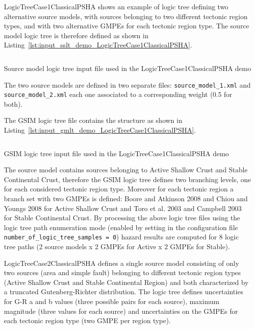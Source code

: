 LogicTreeCase1ClassicalPSHA shows an example of logic tree defining two
alternative source models, with sources belonging to two different tectonic
region types, and with two alternative GMPEs for each tectonic  region type.
The source model logic tree is therefore defined as shown in
Listing~\ref{lst:input_sslt_demo_LogicTreeCase1ClassicalPSHA}.

\begin{listing}[htbp]
  \inputminted[firstline=1,firstnumber=1,fontsize=\footnotesize,frame=single,linenos,bgcolor=lightgray]{xml}{oqum/hazard/verbatim/input_sslt_demo_LogicTreeCase1ClassicalPSHA.xml}
  \caption{Source model logic tree input file used in the LogicTreeCase1ClassicalPSHA demo}
  \label{lst:input_sslt_demo_LogicTreeCase1ClassicalPSHA}
\end{listing}

The two source models are defined in two separate files:
\texttt{source\_\-model\_\-1.xml} and \texttt{source\_\-model\_\-2.xml} each
one associated to a corresponding weight (0.5 for both).

The GSIM logic tree file contains the structure as shown in
Listing~\ref{lst:input_gmlt_demo_LogicTreeCase1ClassicalPSHA}.

\begin{listing}[htbp]
  \inputminted[firstline=1,firstnumber=1,fontsize=\footnotesize,frame=single,linenos,bgcolor=lightgray]{xml}{oqum/hazard/verbatim/input_gmlt_demo_LogicTreeCase1ClassicalPSHA.xml}
  \caption{GSIM logic tree input file used in the LogicTreeCase1ClassicalPSHA demo}
  \label{lst:input_gmlt_demo_LogicTreeCase1ClassicalPSHA}
\end{listing}

The source model contains sources belonging to Active Shallow Crust and
Stable Continental Crust, therefore the GSIM logic tree defines two branching
levels, one for each considered tectonic region type. Moreover for each
tectonic region a branch set with two GMPEs is defined: Boore and Atkinson
2008 and Chiou and Youngs 2008 for Active Shallow Crust and Toro et al. 2003
and Campbell 2003 for Stable Continental Crust. By processing the above logic
tree files using the logic tree path enumeration mode (enabled by setting in
the configuration file \texttt{number\_\-of\_\-logic\_\-tree\_\-samples = 0})
hazard results are computed for 8 logic tree paths (2 source models x 2 GMPEs
for Active x 2 GMPEs for Stable).

LogicTreeCase2ClassicalPSHA defines a single source model consisting of only
two sources (area and simple fault) belonging to different tectonic region
types (Active Shallow Crust and Stable Continental Region) and both
characterized by a truncated Gutenberg-Richter distribution. The logic tree
defines uncertainties for G-R a and b values (three possible pairs for each
source), maximum magnitude (three values for each source) and uncertainties
on the GMPEs for each tectonic region type (two GMPE per region type).

